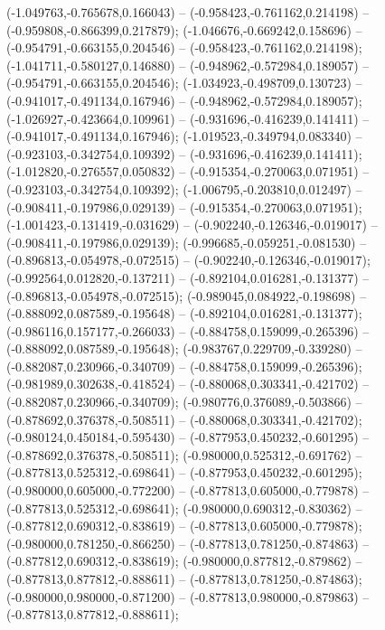  (-1.049763,-0.765678,0.166043) -- (-0.958423,-0.761162,0.214198) -- (-0.959808,-0.866399,0.217879);
 (-1.046676,-0.669242,0.158696) -- (-0.954791,-0.663155,0.204546) -- (-0.958423,-0.761162,0.214198);
 (-1.041711,-0.580127,0.146880) -- (-0.948962,-0.572984,0.189057) -- (-0.954791,-0.663155,0.204546);
 (-1.034923,-0.498709,0.130723) -- (-0.941017,-0.491134,0.167946) -- (-0.948962,-0.572984,0.189057);
 (-1.026927,-0.423664,0.109961) -- (-0.931696,-0.416239,0.141411) -- (-0.941017,-0.491134,0.167946);
 (-1.019523,-0.349794,0.083340) -- (-0.923103,-0.342754,0.109392) -- (-0.931696,-0.416239,0.141411);
 (-1.012820,-0.276557,0.050832) -- (-0.915354,-0.270063,0.071951) -- (-0.923103,-0.342754,0.109392);
 (-1.006795,-0.203810,0.012497) -- (-0.908411,-0.197986,0.029139) -- (-0.915354,-0.270063,0.071951);
 (-1.001423,-0.131419,-0.031629) -- (-0.902240,-0.126346,-0.019017) -- (-0.908411,-0.197986,0.029139);
 (-0.996685,-0.059251,-0.081530) -- (-0.896813,-0.054978,-0.072515) -- (-0.902240,-0.126346,-0.019017);
 (-0.992564,0.012820,-0.137211) -- (-0.892104,0.016281,-0.131377) -- (-0.896813,-0.054978,-0.072515);
 (-0.989045,0.084922,-0.198698) -- (-0.888092,0.087589,-0.195648) -- (-0.892104,0.016281,-0.131377);
 (-0.986116,0.157177,-0.266033) -- (-0.884758,0.159099,-0.265396) -- (-0.888092,0.087589,-0.195648);
 (-0.983767,0.229709,-0.339280) -- (-0.882087,0.230966,-0.340709) -- (-0.884758,0.159099,-0.265396);
 (-0.981989,0.302638,-0.418524) -- (-0.880068,0.303341,-0.421702) -- (-0.882087,0.230966,-0.340709);
 (-0.980776,0.376089,-0.503866) -- (-0.878692,0.376378,-0.508511) -- (-0.880068,0.303341,-0.421702);
 (-0.980124,0.450184,-0.595430) -- (-0.877953,0.450232,-0.601295) -- (-0.878692,0.376378,-0.508511);
 (-0.980000,0.525312,-0.691762) -- (-0.877813,0.525312,-0.698641) -- (-0.877953,0.450232,-0.601295);
 (-0.980000,0.605000,-0.772200) -- (-0.877813,0.605000,-0.779878) -- (-0.877813,0.525312,-0.698641);
 (-0.980000,0.690312,-0.830362) -- (-0.877812,0.690312,-0.838619) -- (-0.877813,0.605000,-0.779878);
 (-0.980000,0.781250,-0.866250) -- (-0.877813,0.781250,-0.874863) -- (-0.877812,0.690312,-0.838619);
 (-0.980000,0.877812,-0.879862) -- (-0.877813,0.877812,-0.888611) -- (-0.877813,0.781250,-0.874863);
 (-0.980000,0.980000,-0.871200) -- (-0.877813,0.980000,-0.879863) -- (-0.877813,0.877812,-0.888611);
